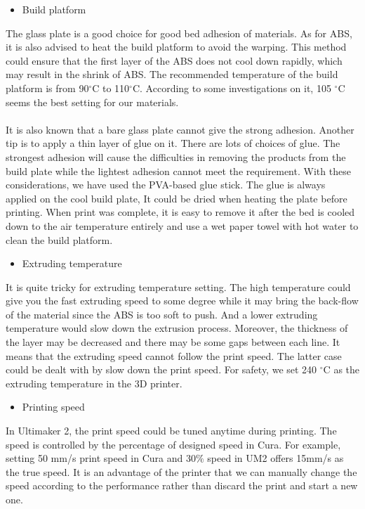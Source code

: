 \begin{itemize}
\item Build platform
\end{itemize}
The glass plate is a good choice for good bed adhesion of materials. As for ABS, it is also advised to heat the build platform to avoid the warping. This method could ensure that the first layer of the ABS does not cool down rapidly, which may result in the shrink of ABS. The recommended temperature of the build platform is from 90$^{\circ}$C to 110$^{\circ}$C.  According to some investigations on it, 105 $^{\circ}$C seems the best setting for our materials. \\
\\
It is also known that a bare glass plate cannot give the strong adhesion. Another tip is to apply a thin layer of glue on it. There are lots of choices of glue. The strongest adhesion will cause the difficulties in removing the products from the build plate while the lightest adhesion cannot meet the requirement. With these considerations, we have used the PVA-based glue stick. The glue is always applied on the cool build plate, It could be dried when heating the plate before printing.  When print was complete, it is easy to remove it after the bed is cooled down to the air temperature entirely and use a wet paper towel with hot water to clean the build platform. 
\begin{itemize}
\item Extruding temperature
\end{itemize}
It is quite tricky for extruding temperature setting. The high temperature could give you the fast extruding speed to some degree while it may bring the back-flow of the material since the ABS is too soft to push. And a lower extruding temperature would slow down the extrusion process. Moreover, the thickness of the layer may be decreased and there may be some gaps between each line. It means that the extruding speed cannot follow the print speed. The latter case could be dealt with by slow down the print speed. For safety, we set 240 $^{\circ}$C as the extruding temperature in the 3D printer. 
\begin{itemize}
\item Printing speed
\end{itemize}
In Ultimaker 2, the print speed could be tuned anytime during printing. The speed is controlled by the percentage of designed speed in Cura. For example, setting 50 mm/s print speed in Cura and 30$\%$ speed in UM2 offers 15mm/s as the true speed. It is an advantage of the printer that we can manually change the speed according to the performance rather than discard the print and start a new one.
